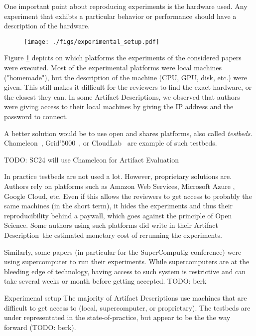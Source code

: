 \documentclass[sigconf]{acmart}
\newcommand{\ad}{Artifact Description}
\newcommand{\aeval}{Artifact Evaluation}
\newcommand{\todo}[1]{{\color{red}TODO: #1}}
\begin{document}
One important point about reproducing experiments is the hardware used.
Any experiment that exhibts a particular behavior or performance should have a description of the hardware. 

\begin{figure}
  \centering
  \texttt{[image: ./figs/experimental\_setup.pdf]}
  \caption{}\label{fig:experimental_setup}
\end{figure}

Figure \ref{fig:experimental_setup} depicts on which platforms the experiments of the considered papers were executed.
Most of the experimental platforms were local machines ("homemade"), but the description of the machine (CPU, GPU, disk, etc.) were given.
This still makes it difficult for the reviewers to find the exact hardware, or the closest they can.
In some \ad s, we observed that authors were giving access to their local machines by giving the IP address and the password to connect.


A better solution would be to use open and shares platforms, also called \emph{testbeds}.
Chameleon\ \cite{chameleon}, Grid'5000\ \cite{grid5000}, or CloudLab\ \cite{cloudlab} are example of such testbeds.

\todo{SC24 will use Chameleon for \aeval}

In practice testbeds are not used a lot.
However, proprietary solutions are.
Authors rely on platforms such as Amazon Web Services, Microsoft Azure , Google Cloud, etc.
Even if this allows the reviewers to get access to probably the same machines (in the short term), it hides the experiments and thus their reproducibility behind a paywall, which goes against the principle of Open Science.
Some authors using such platforms did write in their \ad\ the estimated monetary cost of rerunning the experiments.

Similarly, some papers (in particular for the SuperComputig conference) were using supercomputer to run their experiments.
While supercomputers are at the bleeding edge of technology, having access to such system is restrictive and can take several weeks or month before getting accepted.
\todo{berk}

\begin{lesson}{Experimenal setup}{}
  The majority of \ad s use machines that are difficult to get access to (local, supercomputer, or proprietary). 
  The testbeds are under representated in the state-of-practice, but appear to be the the way forward (\todo{berk}).
\end{lesson}
\end{document}
